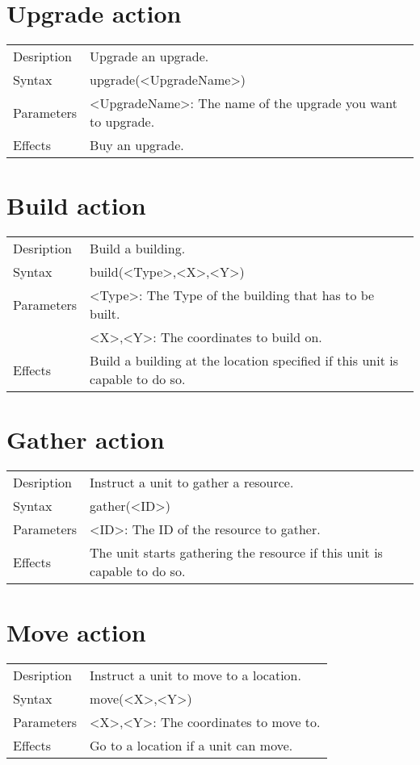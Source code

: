 \documentclass[english,11pt]{report}
\begin{document}
\section{Upgrade action}
\begin{tabularx}{\textwidth}{lX}
 Desription & Upgrade an upgrade. \\
 Syntax & upgrade(<UpgradeName>) \\
 Parameters & <UpgradeName>: The name of the upgrade you want to upgrade.\\
 Effects &  Buy an upgrade.
\end{tabularx}

\section{Build action}
\begin{tabularx}{\textwidth}{lX}
 Desription & Build a building. \\
 Syntax & build(<Type>,<X>,<Y>) \\
 Parameters & <Type>: The Type of the building that has to be built.\\
            & <X>,<Y>: The coordinates to build on.\\
 Effects &  Build a building at the location specified if this unit is capable to do so.
\end{tabularx}

\section{Gather action}
\begin{tabularx}{\textwidth}{lX}
 Desription & Instruct a unit to gather a resource. \\
 Syntax & gather(<ID>) \\
 Parameters & <ID>: The ID of the resource to gather.\\
 Effects &  The unit starts gathering the resource if this unit is capable to do so.
\end{tabularx}

\section{Move action}
\begin{tabularx}{\textwidth}{lX}
 Desription & Instruct a unit to move to a location. \\
 Syntax & move(<X>,<Y>) \\
 Parameters & <X>,<Y>: The coordinates to move to.\\
 Effects &  Go to a location if a unit can move.
\end{tabularx}
\end{document}
